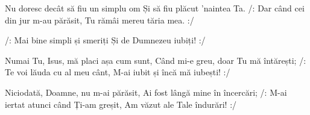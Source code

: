 \beginverse
Nu doresc decât să fiu un simplu om
Și să fiu plăcut 'naintea Ta.
/: Dar când cei din jur m-au părăsit,
Tu rămâi mereu tăria mea. :/
\endverse

\beginchorus
/: Mai bine simpli și smeriți
Și de Dumnezeu iubiți! :/
\endchorus

\beginverse
Numai Tu, Isus, mă placi așa cum sunt,
Când mi-e greu, doar Tu mă întărești;
/: Te voi lăuda cu al meu cânt,
M-ai iubit și încă mă iubești! :/
\endverse

\beginverse
Niciodată, Doamne, nu m-ai părăsit,
Ai fost lângă mine în încercări;
/: M-ai iertat atunci când Ți-am greșit,
Am văzut ale Tale îndurări! :/
\endverse
\endsong